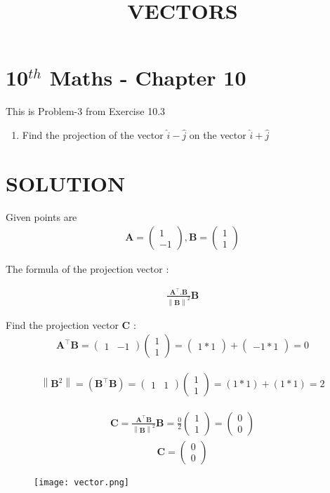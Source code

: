 \documentclass[12pt]{article}
\newcommand{\myvec}[1]{\ensuremath{\begin{pmatrix}#1\end{pmatrix}}}
\providecommand{\norm}[1]{\left\lVert#1\right\rVert}
\let\vec\mathbf
\begin{document}
\begin{center}
\title{\textbf{VECTORS}}
\date{\vspace{-5ex}} %
\maketitle
\end{center}

\setcounter{page}{1}

\section{10$^{th}$ Maths - Chapter 10}

This is Problem-3 from Exercise 10.3

\begin{enumerate}
\item Find the projection of the vector $\hat{i}-\hat{j}$ on the vector $\hat{i}+\hat{j}$  
\end{enumerate}
\section{SOLUTION}
Given points are
\begin{align}
 \vec{A}=\myvec{1\\ -1} ,
 \vec{B}=\myvec{1\\ 1}
\end{align}

The formula of the projection vector :
 
\begin{align}
	\frac{\vec{A}^\top.\vec{B}}{\norm{\vec{B}}^2} \vec{B}
\end{align}

Find the projection vector $\vec{C}$ :
\begin{align}
	\vec{A}^\top \vec{B} = \myvec{1 &-1} \myvec{1\\ 1}=\myvec{1 *1}+\myvec{-1 * 1}=0
\end{align}

\begin{align}
	\norm {\vec {B}^2} = (\vec{B}^\top  \vec{B})=\myvec{1 & 1} \myvec{1\\ 1}= (1 * 1)+(1 * 1)=2
\end{align}

\begin{align}
\vec{C} = 
	\frac{\vec{A}^\top  \vec{B}}{\norm {\vec{B}}^2} \vec{B}
   =\frac{0}{2} \myvec{1\\ 1}
	=\myvec{0\\ 0}
\end{align}
\begin{align}
	\vec{C}=\myvec{0\\ 0}
\end{align}
\begin{figure}[h]
  \centering
  \texttt{[image: vector.png]}
\caption{}
\end{figure}
\end{document}
